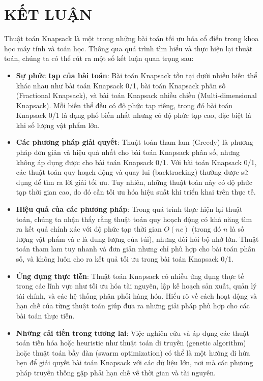 \chapter{KẾT LUẬN}
Thuật toán Knapsack là một trong những bài toán tối ưu hóa cổ điển trong khoa học máy tính và toán học. Thông qua quá trình tìm hiểu và thực hiện lại thuật toán, chúng ta có thể rút ra một số kết luận quan trọng sau:

\begin{itemize}
    \item \textbf{Sự phức tạp của bài toán}: Bài toán Knapsack tồn tại dưới nhiều biến thể khác nhau như bài toán Knapsack 0/1, bài toán Knapsack phân số (Fractional Knapsack), và bài toán Knapsack nhiều chiều (Multi-dimensional Knapsack). Mỗi biến thể đều có độ phức tạp riêng, trong đó bài toán Knapsack 0/1 là dạng phổ biến nhất nhưng có độ phức tạp cao, đặc biệt là khi số lượng vật phẩm lớn.

    \item \textbf{Các phương pháp giải quyết}: Thuật toán tham lam (Greedy) là phương pháp đơn giản và hiệu quả nhất cho bài toán Knapsack phân số, nhưng không áp dụng được cho bài toán Knapsack 0/1. Với bài toán Knapsack 0/1, các thuật toán quy hoạch động và quay lui (backtracking) thường được sử dụng để tìm ra lời giải tối ưu. Tuy nhiên, những thuật toán này có độ phức tạp thời gian cao, do đó cần tối ưu hóa hiệu suất khi triển khai trên thực tế.

    \item \textbf{Hiệu quả của các phương pháp}: Trong quá trình thực hiện lại thuật toán, chúng ta nhận thấy rằng thuật toán quy hoạch động có khả năng tìm ra kết quả chính xác với độ phức tạp thời gian $O(nc)$ (trong đó $n$ là số lượng vật phẩm và $c$ là dung lượng của túi), nhưng đòi hỏi bộ nhớ lớn. Thuật toán tham lam tuy nhanh và đơn giản nhưng chỉ phù hợp cho bài toán phân số, và không luôn cho ra kết quả tối ưu trong bài toán Knapsack 0/1.

    \item \textbf{Ứng dụng thực tiễn}: Thuật toán Knapsack có nhiều ứng dụng thực tế trong các lĩnh vực như tối ưu hóa tài nguyên, lập kế hoạch sản xuất, quản lý tài chính, và các hệ thống phân phối hàng hóa. Hiểu rõ về cách hoạt động và hạn chế của từng thuật toán giúp đưa ra những giải pháp phù hợp cho các bài toán thực tiễn.

    \item \textbf{Những cải tiến trong tương lai}: Việc nghiên cứu và áp dụng các thuật toán tiến hóa hoặc heuristic như thuật toán di truyền (genetic algorithm) hoặc thuật toán bầy đàn (swarm optimization) có thể là một hướng đi hứa hẹn để giải quyết bài toán Knapsack với các dữ liệu lớn, nơi mà các phương pháp truyền thống gặp phải hạn chế về thời gian và tài nguyên.
\end{itemize}

